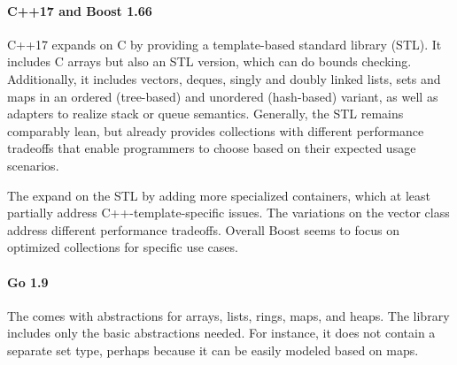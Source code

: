 \documentclass[sigconf, authorversion]{acmart}
\begin{document}
\paragraph{C++17 and Boost 1.66}

% 
% 

C++17\citep{Cpp17} expands on C
by providing a template-based standard library (STL).
It includes C arrays but also an STL version, which can do bounds checking.
Additionally, it includes vectors, deques, singly and doubly linked lists,
sets and maps in an ordered (tree-based) and unordered (hash-based) variant,
as well as adapters to realize stack or queue semantics.
Generally, the STL remains comparably lean,
but already provides collections with different performance tradeoffs
that enable programmers to choose based on their expected usage scenarios.

The 
expand on the STL by adding more specialized containers,
which at least partially address C++-template-specific issues.
The variations on the vector class address different performance tradeoffs.
Overall Boost seems to focus on optimized collections
for specific use cases.

\paragraph{Go 1.9}


The 
comes with abstractions for arrays,
lists, rings, maps, and heaps.
The library includes only the basic abstractions needed.
For instance, it does not contain a separate set type,
perhaps because it can be easily modeled based on maps.
\end{document}

